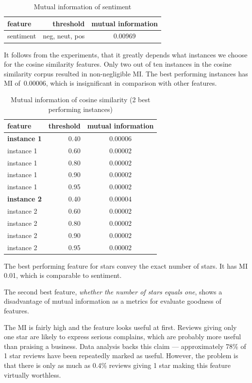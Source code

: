 \begin{table}[h!]
\centering
\begin{tabular}{lrS[table-format=3.2]}
\toprule
\textbf{feature} & \textbf{threshold} & \textbf{mutual information} \\
\midrule
sentiment & neg, neut, pos & 0.00969 \\
\bottomrule
\end{tabular}
\caption{Mutual information of sentiment}\label{tab:mi_sentiment}
\end{table}

It follows from the experiments, that it greatly depends what instances
we choose for the cosine similarity features.
Only two out of ten instances in the cosine similarity corpus resulted in
non-negligible MI.
The best performing instances has MI of~\num{0.00006}, which is insignificant
in comparison with other features.

\begin{table}[h!]
\centering
\begin{tabular}{lrS[table-format=3.2]}
\toprule
\textbf{feature} & \textbf{threshold} & \textbf{mutual information} \\
\midrule
\textbf{instance 1} & 0.40 & 0.00006 \\
instance 1 & 0.60 & 0.00002 \\
instance 1 & 0.80 & 0.00002 \\
instance 1 & 0.90 & 0.00002 \\
instance 1 & 0.95 & 0.00002 \\
\midrule
\textbf{instance 2} & 0.40 & 0.00004 \\
instance 2 & 0.60 & 0.00002 \\
instance 2 & 0.80 & 0.00002 \\
instance 2 & 0.90 & 0.00002 \\
instance 2 & 0.95 & 0.00002 \\
\bottomrule
\end{tabular}
\caption{Mutual information of cosine similarity (2 best performing instances)}\label{tab:mi_cossim}
\end{table}

The best performing feature for stars convey the exact number of stars.
It has MI 0.01, which is comparable to sentiment.

The second best feature, \textit{whether the number of stars equals one}, shows a disadvantage of mutual information as a metrics for evaluate goodness of features.

The MI is fairly high and the feature looks useful at first.
Reviews giving only one star are likely to express serious complains, which are probably more useful than praising a business.
Data analysis backs this claim --- approximately 78\% of 1 star reviews have been repeatedly marked as useful.
However, the problem is that there is only as much as 0.4\% reviews giving 1 star making this
feature virtually worthless.

